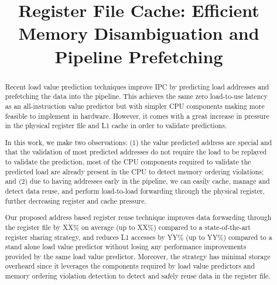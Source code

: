 \documentclass{sig-alternate}
\title{Register File Cache: Efficient Memory Disambiguation and Pipeline Prefetching}
\begin{document}
\maketitle
\thispagestyle{firstpage}
\pagestyle{plain}




\begin{abstract}
{\color{red} Recent load value prediction techniques improve IPC by predicting load addresses and prefetching the data into the pipeline. This achieves the same zero load-to-use latency as an all-instruction value predictor but with simpler CPU components making more feasible to implement in hardware. However, it comes with a great increase in pressure in the physical register file and L1 cache in order to validate predictions. %

In this work, we make two observations: (1) the value predicted address are special and that the validation of most predicted addresses do not require the load to be replayed to validate the prediction, most of the CPU components required to validate the predicted load are already present in the CPU to detect memory ordering violations; and (2) due to having addresses early in the pipeline, we can easily cache, manage and detect data reuse, and perform load-to-load forwarding through the physical register, further decreasing register and cache pressure. %

Our proposed address based register reuse technique improves data forwarding through the register file by XX\% on average (up to XX\%) compared to a state-of-the-art register sharing strategy, and reduces L1 accesses by YY\% (up to YY\%) compared to a stand alone load value predictor without losing any performance improvements provided by the same load value predictor. Moreover, the strategy has minimal storage overheard since it leverages the components required by load value predictors and memory ordering violation detection to detect and safely reuse data in the register file.
}

\end{abstract}
\end{document}
